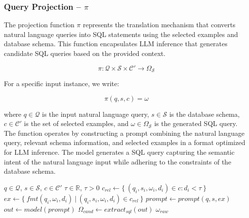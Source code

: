 \subsubsection{Query Projection – $\pi$}\label{design:projection-function}

The projection function $\pi$ represents the translation mechanism that
converts natural language queries into SQL statements using the selected
examples and database schema. This function encapsulates LLM inference that
generates candidate SQL queries based on the provided context.

$$
\pi: \mathcal{Q} \times \mathcal{S} \times \mathcal{C}' \rightarrow \Omega_{\mathcal{S}}
$$

\vspace{0.5em}

For a specific input instance, we write:

$$
\pi(q, s, c) = \omega
$$

\vspace{0.5em}

where $q \in \mathcal{Q}$ is the input natural language query, $s \in
\mathcal{S}$ is the database schema, $c \in \mathcal{C}'$ is the set of
selected examples, and $\omega \in \Omega_{\mathcal{S}}$ is the generated SQL
query. The function operates by constructing a prompt combining the natural
language query, relevant schema information, and selected examples in a format
optimized for LLM inference. The model generates a SQL query capturing the
semantic intent of the natural language input while adhering to the constraints
of the database schema.

\begin{algorithm}
\caption{$\pi$ - Query Projection}\label{algorithms:pi}
\begin{algorithmic}[1]
\Require $q \in \mathcal{Q}$, $s \in \mathcal{S}$, $c \in \mathcal{C}'$
\Require $\tau \in \mathbb{R}$, $\tau > 0$                     
\State $c_{rel} \gets \{~(q_i, s_i, \omega_i, d_i) \in c : d_i < \tau~\}$  
\State $ex \gets \{~fmt(q_i, \omega_i, d_i)~|~(q_i, s_i, \omega_i, d_i) \in c_{rel}~\}$  
\State $prompt \gets prompt(q, s, ex)$                         
\State $out \gets model(prompt)$                               
\State $\Omega_{cand} \gets extract_{sql}(out)$                
                         
                   
        \State \Return $\omega_{raw}$                          
    \EndIf
\EndFor
\end{algorithmic}
\end{algorithm}

